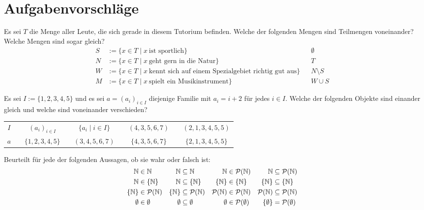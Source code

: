\clearpage
\section{Aufgabenvorschläge}


\begin{aufg}[Kennenlernen]
    Es sei $T$ die Menge aller Leute, die sich gerade in diesem Tutorium befinden.
    Welche der folgenden Mengen sind Teilmengen voneinander? Welche Mengen sind sogar gleich?
    \begin{align*}
        S&:= \{ x\in T \mid x\ \text{ist sportlich} \}  && \emptyset  \\
        N&:=  \{ x\in T \mid x\ \text{geht gern in die Natur} \} && T \\
        W & := \{ x\in T \mid x\ \text{kennt sich auf einem Spezialgebiet richtig gut aus} \} &&  N\setminus S  \\
        M &:= \{ x \in T \mid x\ \text{spielt ein Musikinstrument} \} && W \cup S
    \end{align*}
\end{aufg}


\begin{aufg}
    Es sei $I:=\{1,2,3,4,5\}$ und es sei $a=(a_i)_{i\in I}$ diejenige Familie mit $a_i=i+2$ für jedes $i\in I$. Welche der folgenden Objekte sind einander gleich und welche sind voneinander verschieden?
    \begin{center}
    {\renewcommand{\arraystretch}{1.6}
    \begin{tabular}{ccccccccc}
        $I$ && $(a_i)_{i\in I}$&& $\{a_i\mid i\in I\}$ && $(4,3,5,6,7)$ && $(2,1,3,4,5,5)$ \\
        $a$ && $\{1,2,3,4,5\}$ && $(3,4,5,6,7)$ && $\{4,3,5,6,7\}$ && $\{2,1,3,4,5,5\}$
	\end{tabular}}
    \end{center}
\end{aufg}


\begin{aufg}
    Beurteilt für jede der folgenden Aussagen, ob sie wahr oder falsch ist:
    \begin{align*}
        \mathbb N&  \in \mathbb N & \mathbb N & \subseteq \mathbb N & \mathbb N & \in \mathcal P(\mathbb N) &  \mathbb N & \subseteq \mathcal P(\mathbb N) \\
        \mathbb N & \in \{ \mathbb N\} & \mathbb N & \subseteq \{ \mathbb N\} & \{ \mathbb N\} & \in \{ \mathbb N\} & \{\mathbb N\} & \subseteq \{ \mathbb N\} \\
        \{\mathbb N\} & \in \mathcal P(\mathbb N) & \{ \mathbb N\} & \subseteq \mathcal P(\mathbb N) & \mathcal P(\mathbb N) & \in \mathcal P(\mathbb N) & \mathcal P(\mathbb N) & \subseteq \mathcal P(\mathbb N) \\
        \emptyset & \in \emptyset & \emptyset &\subseteq \emptyset & \emptyset & \in \mathcal P(\emptyset) & \{\emptyset\} & = \mathcal P(\emptyset)
    \end{align*}
\end{aufg}


